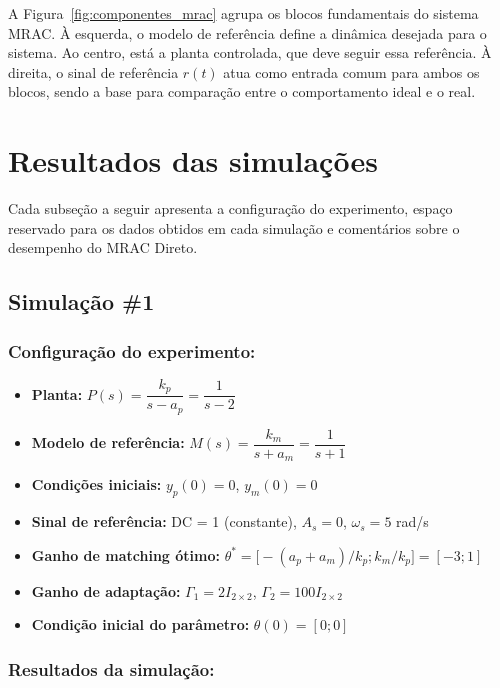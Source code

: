 \documentclass[10pt]{article}
\begin{document}
A Figura~\ref{fig:componentes_mrac} agrupa os blocos fundamentais do sistema MRAC. À esquerda, o modelo de referência define a dinâmica desejada para o sistema. Ao centro, está a planta controlada, que deve seguir essa referência. À direita, o sinal de referência $r(t)$ atua como entrada comum para ambos os blocos, sendo a base para comparação entre o comportamento ideal e o real.

\section{Resultados das simulações}

Cada subseção a seguir apresenta a configuração do experimento, espaço reservado para os dados obtidos em cada simulação e comentários sobre o desempenho do MRAC Direto.

\newpage

\subsection{Simulação \#1}
\subsubsection{Configuração do experimento:}
\begin{itemize}
\item \textbf{Planta:} $P(s) = \dfrac{k_p}{s - a_p} = \dfrac{1}{s - 2}$
\item \textbf{Modelo de referência:} $M(s) = \dfrac{k_m}{s + a_m} = \dfrac{1}{s + 1}$
\item \textbf{Condições iniciais:} $y_p(0)=0$, $y_m(0)=0$
\item \textbf{Sinal de referência:} DC = 1 (constante), $A_s=0$, $\omega_s=5$ rad/s
\item \textbf{Ganho de matching ótimo:} $\theta^* = \bigl[-(a_p + a_m)/k_p;k_m/k_p\bigr] = [-3;1]$
\item \textbf{Ganho de adaptação:} $\Gamma_1 = 2I_{2\times2}$, $\Gamma_2 = 100 I_{2\times2}$
\item \textbf{Condição inicial do parâmetro:} $\theta(0) = [0;0]$
\end{itemize}

\subsubsection{Resultados da simulação:}
\end{document}
